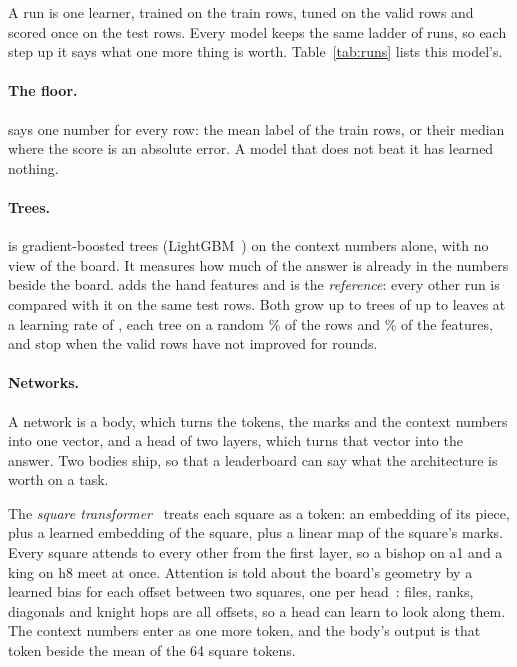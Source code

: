 A run is one learner, trained on the train rows, tuned on the valid rows and
scored once on the test rows. Every model keeps the same ladder of runs, so
each step up it says what one more thing is worth. Table~\ref{tab:runs} lists
this model's.

\paragraph{The floor.}
 says one number for every row: the mean label of the train
rows, or their median where the score is an absolute error. A model that does
not beat it has learned nothing.

\paragraph{Trees.}
 is gradient-boosted trees (LightGBM~\cite{lightgbm}) on the
context numbers alone, with no view of the board. It measures how much of the
answer is already in the numbers beside the board.  adds the
hand features and is the \emph{reference}: every other run is compared with
it on the same test rows. Both grow up to  trees of up
to  leaves at a learning rate of ,
each tree on a random \% of the rows and
\% of the features, and stop when the valid
rows have not improved for  rounds.

\paragraph{Networks.}
A network is a body, which turns the tokens, the marks and the context numbers
into one vector, and a head of two layers, which turns that vector into the
answer. Two bodies ship, so that a leaderboard can say what the architecture
is worth on a task.

The \emph{square transformer}~\cite{attention} treats each square as a token:
an embedding of its piece, plus a learned embedding of the square, plus a
linear map of the square's marks. Every square attends to every other from the
first layer, so a bishop on a1 and a king on h8 meet at once. Attention is
told about the board's geometry by a learned bias for each offset between two
squares, one per head~\cite{relative}: files, ranks, diagonals and knight hops
are all offsets, so a head can learn to look along them. The context numbers
enter as one more token, and the body's output is that token beside the mean
of the 64 square tokens.

